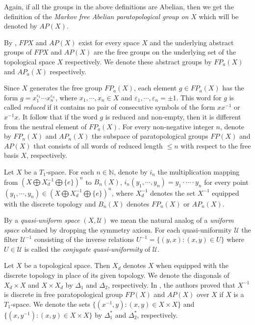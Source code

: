 \documentclass{amsart}
\theoremstyle{definition}
\begin{document}
Again, if all the groups in the above definitions are Abelian, then we get the definition of the {\it Markov free Abelian paratopological group on} $X$ which will be denoted by $AP(X)$.

By \cite{RS}, $FPX$ and $AP(X)$ exist for every space $X$ and the underlying abstract groups of $FPX$ and $AP(X)$ are the free groups on the underlying set of the topological space $X$ respectively. We denote these abstract groups by $FP_{a}(X)$ and $AP_{a}(X)$ respectively.

Since $X$ generates the free group $FP_{a}(X)$, each element $g\in FP_{a}(X)$ has the form $g=x_{1}^{\varepsilon_{1}}\cdots x_{n}^{\varepsilon_{n}}$, where $x_{1}, \cdots, x_{n}\in X$ and $\varepsilon_{1}, \cdots, \varepsilon_{n}=\pm 1$. This word for $g$ is called {\it reduced} if it contains no pair of consecutive symbols of the form $xx^{-1}$ or $x^{-1}x$. It follow that if the word $g$ is reduced and non-empty, then it is different from the neutral element of $FP_{a}(X)$. For every non-negative integer $n$, denote by $FP_{n}(X)$ and $AP_{n}(X)$ the subspace of paratopological groups $FP(X)$ and $AP(X)$ that consists of all words of reduced length $\leq n$ with respect to the free basis $X$, respectively.

Let $X$ be a $T_{1}$-space. For each $n\in\mathbb{N}$, denote by $i_{n}$ the multiplication mapping from $(X\bigoplus X_{d}^{-1}\bigoplus\{e\})^{n}$ to $B_{n}(X)$, $i_{n}(y_{1}, \cdots, y_{n})=y_{1}\cdot \cdots\cdot y_{n}$ for every point $(y_{1}, \cdots, y_{n})\in (X\bigoplus X_{d}^{-1}\bigoplus\{e\})^{n}$, where $X_{d}^{-1}$ denotes the set $X^{-1}$ equipped with the discrete topology and $B_{n}(X)$ denotes $FP_{n}(X)$ or $AP_{n}(X)$.


By a {\it quasi-uniform space} $(X, \mathscr{U})$ we mean the natural analog of a {\it uniform space} obtained by dropping the symmetry axiom. For each quasi-uniformity $\mathscr{U}$ the filter  $\mathscr{U}^{-1}$ consisting of the inverse relations $U^{-1}=\{(y, x): (x, y)\in U\}$ where $U\in\mathscr{U}$ is called the {\it conjugate quasi-uniformity} of $\mathscr{U}$.

Let $X$ be a topological space. Then $X_{d}$ denotes $X$ when equipped with the discrete topology in place of its given topology. We denote the diagonals of $X_{d}\times X$ and $X\times X_{d}$ by $\Delta_{1}$ and $\Delta_{2}$, respectively.
In \cite{PN2006}, the authors proved that $X^{-1}$ is discrete in free paratopological group $FP(X)$ and $AP(X)$ over $X$ if $X$ is a $T_{1}$-space. We denote the sets $\{(x^{-1}, y): (x, y)\in X\times X\}$ and $\{(x, y^{-1}): (x, y)\in X\times X\}$ by $\Delta_{1}^{\ast}$ and $\Delta_{2}^{\ast}$, respectively.
\end{document}
